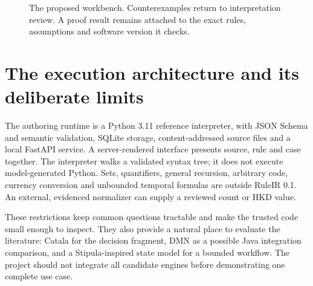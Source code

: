\documentclass[12pt,a4paper,oneside,openany]{book}
\begin{document}
\begin{figure}[htbp]
\centering
{}
\caption{The proposed workbench. Counterexamples return to interpretation review.
A proof result remains attached to the exact rules, assumptions and software
version it checks.}
\label{fig:architecture}
\end{figure}

\section{The execution architecture and its deliberate limits}
\label{merge:P-03-product:07}


The authoring runtime is a Python 3.11 reference interpreter, with JSON Schema and
semantic validation, SQLite storage, content-addressed source files and a local
FastAPI service. A server-rendered interface presents source, rule and case
together. The interpreter walks a validated syntax tree; it does not execute
model-generated Python. Sets, quantifiers, general recursion, arbitrary code,
currency conversion and unbounded temporal formulas are outside RuleIR 0.1.
An external, evidenced normalizer can supply a reviewed count or HKD value.

These restrictions keep common questions tractable and make the trusted code
small enough to inspect. They also provide a natural place to evaluate the
literature: Catala for the decision fragment, DMN as a possible Java integration comparison,
and a Stipula-inspired state model for a bounded workflow. The project should not
integrate all candidate engines before demonstrating one complete use case.
\end{document}
